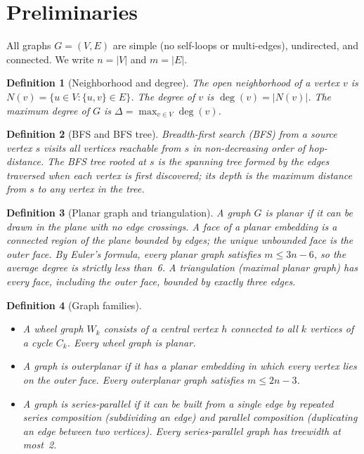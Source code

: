 \documentclass[11pt,twocolumn]{article}
\newtheorem{definition}{Definition}[section]
\begin{document}
\section{Preliminaries}
\label{sec:prelim}

All graphs $G=(V,E)$ are simple (no self-loops or multi-edges), undirected,
and connected.  We write $n=|V|$ and $m=|E|$.

\begin{definition}[Neighborhood and degree]
The \emph{open neighborhood} of a vertex $v$ is $N(v)=\{u\in V:\{u,v\}\in E\}$.
The \emph{degree} of $v$ is $\deg(v)=|N(v)|$.  The \emph{maximum degree}
of $G$ is $\Delta=\max_{v\in V}\deg(v)$.
\end{definition}

\begin{definition}[BFS and BFS tree]
\emph{Breadth-first search} (BFS) from a source vertex $s$ visits all
vertices reachable from $s$ in non-decreasing order of hop-distance.  The
\emph{BFS tree} rooted at $s$ is the spanning tree formed by the edges
traversed when each vertex is first discovered; its \emph{depth} is the
maximum distance from $s$ to any vertex in the tree.
\end{definition}

\begin{definition}[Planar graph and triangulation]
A graph $G$ is \emph{planar} if it can be drawn in the plane with no edge
crossings.  A \emph{face} of a planar embedding is a connected region of
the plane bounded by edges; the unique unbounded face is the \emph{outer
face}.  By Euler's formula, every planar graph satisfies $m\leq 3n-6$, so
the average degree is strictly less than~6.  A \emph{triangulation}
(maximal planar graph) has every face, including the outer face, bounded
by exactly three edges.
\end{definition}

\begin{definition}[Graph families]
\label{def:families}
\begin{itemize}[noitemsep]
  \item A \emph{wheel graph} $W_k$ consists of a central vertex $h$
        connected to all $k$ vertices of a cycle $C_k$.  Every wheel graph
        is planar.
  \item A graph is \emph{outerplanar} if it has a planar embedding in
        which every vertex lies on the outer face.  Every outerplanar graph
        satisfies $m\leq 2n-3$.
  \item A graph is \emph{series-parallel} if it can be built from a single
        edge by repeated series composition (subdividing an edge) and
        parallel composition (duplicating an edge between two vertices).
        Every series-parallel graph has treewidth at most~2.
\end{itemize}
\end{definition}
\end{document}

